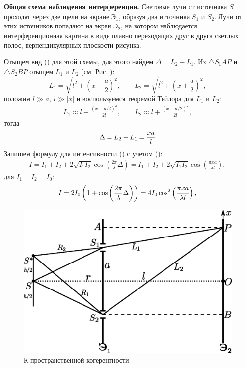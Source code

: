 \documentclass[__main__.tex]{subfiles}
\begin{document}
\textbf{Общая схема наблюдения интерференции.}
Световые лучи от источника $S$ проходят через две щели на экране $\text{Э}_1$, образуя два источника $S_1$ и $S_2$. Лучи от этих источников попадают на экран $\text{Э}_2$, на котором наблюдается интерференционная картина в виде плавно переходящих друг в друга светлых полос, перпендикулярных плоскости рисунка.

Отыщем вид () для этой схемы, для этого найдем $\Delta = L_2 - L_1$. Из
$\triangle S_1AP$ и $\triangle S_2BP$ отыщем $L_1$ и $L_2$ (см. Рис. ):
$$
L_1 = \sqrt{l^2 + \left(x-\frac{a}{2}\right)^2}, \qquad
L_2 = \sqrt{l^2 + \left(x+\frac{a}{2}\right)^2},
$$
положим $l \gg a, \ l \gg |x|$ и воспользуемся теоремой Тейлора для $L_1$ и $L_2$:
\begin{gather*}
L_1 \approx l + \frac{\left(x-a/2\right)^2}{2l}, \qquad
L_2 \approx l + \frac{\left(x+a/2\right)^2}{2l},
\end{gather*}
тогда
\begin{gather}
\llabel{o-02-schemediff}
\displaystyle \Delta = L_2 - L_1 = \frac{xa}{l}
\end{gather}
Запишем формулу для интенсивности () с учетом ():
\begin{gather*}
I = I_1 + I_2 + 2\sqrt{I_1 I_2}\cos\left(\frac{2\pi}{\lambda}\Delta\right) =
    I_1 + I_2 + 2\sqrt{I_1 I_2}\cos\left(\frac{\pi x a}{\lambda l}\right),
\end{gather*}
для $I_1 = I_2 = I_0$:
\begin{gather}
\llabel{o-02-intensesch}
I = 2I_0\left(1 + \cos\left(\frac{2\pi}{\lambda}\Delta\right)\right) =
4I_0\cos^2\left(\frac{\pi xa}{\lambda l}\right),
\end{gather}

\begin{figure}
	\includegraphics[width=1\linewidth]{img/o-02_1}{}
	\caption{К пространственной когерентности}
\end{figure}
\end{document}
